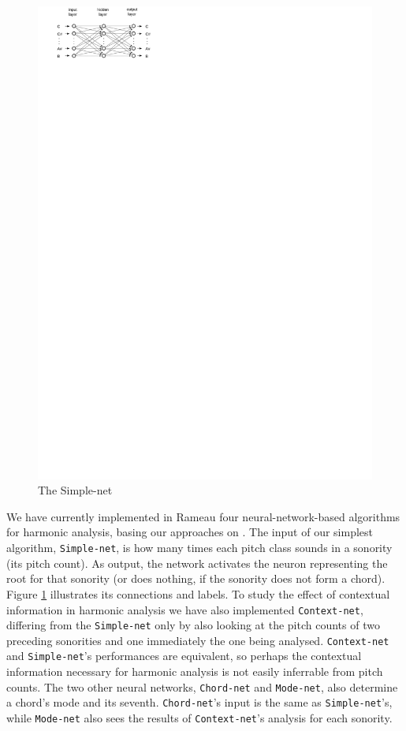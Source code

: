 \documentclass{article}
\begin{document}
\begin{figure}
  \includegraphics[]{neural-networks}
  \caption{The Simple-net}
  \label{fig:simple-net-diagram}
\end{figure}


We have currently implemented in Rameau four neural-network-based
algorithms for harmonic analysis, basing our approaches on
\cite{tsui:harmonic}. The input of our simplest algorithm,
\texttt{Simple\hyp{}net}, is how many times each pitch class sounds in
a sonority (its pitch count). As output, the network activates the
neuron representing the root for that sonority (or does nothing, if
the sonority does not form a chord). Figure
\ref{fig:simple-net-diagram} illustrates its connections and labels.
To study the effect of contextual information in harmonic analysis we
have also implemented \texttt{Context-net}, differing from the
\texttt{Simple\hyp{}net} only by also looking at the pitch counts of
two preceding sonorities and one immediately the one being analysed.
\texttt{Context-net} and \texttt{Simple-net}'s performances are
equivalent, so perhaps the contextual information necessary for
harmonic analysis is not easily inferrable from pitch counts. The two
other neural networks, \texttt{Chord-net} and \texttt{Mode-net}, also
determine a chord's mode and its seventh. \texttt{Chord-net}'s input
is the same as \texttt{Sim\-ple\--net}'s, while \texttt{Mode-net} also
sees the results of \texttt{Context-net}'s analysis for each sonority.
\end{document}
